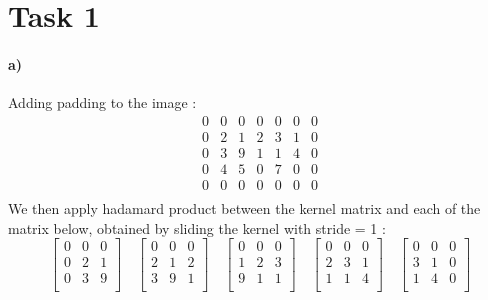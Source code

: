 \documentclass{article}
\begin{document}
	\section*{Task 1}
		\paragraph{a)}
		Adding padding to the image : 
		\[
		\begin{matrix}
			0 & 0 & 0 & 0 & 0 & 0 & 0 \\
			0 & 2 & 1 & 2 & 3 & 1 & 0\\
			0 & 3 & 9 & 1 & 1 & 4 & 0\\
			0 & 4 & 5 & 0 & 7 & 0 & 0\\
			0 & 0 & 0 & 0 & 0 & 0 & 0\\
		\end{matrix}
		\]
		We then apply hadamard product between the kernel matrix and each of the matrix below, obtained by sliding the kernel with stride = 1 :
		\[
		\begin{bmatrix}
			0 & 0 & 0 \\
			0 & 2 & 1 \\
			0 & 3 & 9 \\
		\end{bmatrix}
		\quad
		\begin{bmatrix}
			0 & 0 & 0 \\
			2 & 1 & 2 \\
			3 & 9 & 1 \\
		\end{bmatrix}
		\quad
		\begin{bmatrix}
			0 & 0 & 0 \\
			1 & 2 & 3 \\
			9 & 1 & 1 \\
		\end{bmatrix}
		\quad
		\begin{bmatrix}
			0 & 0 & 0 \\
			2 & 3 & 1 \\
			1 & 1 & 4 \\
		\end{bmatrix}
		\quad
		\begin{bmatrix}
			0 & 0 & 0 \\
			3 & 1 & 0 \\
			1 & 4 & 0 \\
		\end{bmatrix}
		\]
\end{document}
